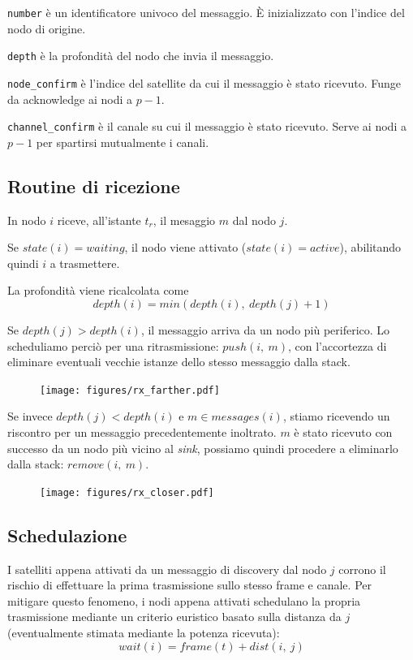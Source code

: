 \documentclass[a4paper,12pt]{article}
\theoremstyle{definition}
\begin{document}
\texttt{number} è un identificatore univoco del messaggio. È inizializzato con l'indice del nodo di origine.

\texttt{depth} è la profondità del nodo che invia il messaggio.

\texttt{node\_confirm} è l'indice del satellite da cui il messaggio è stato ricevuto. Funge da acknowledge ai nodi a $p-1$.

\texttt{channel\_confirm} è il canale su cui il messaggio è stato ricevuto. Serve ai nodi a $p-1$ per spartirsi mutualmente i canali.

\subsection{Routine di ricezione}

In nodo $i$ riceve, all'istante $t_r$, il mesaggio $m$ dal nodo $j$.

Se $state(i) = waiting$, il nodo viene attivato ($state(i) = active$), abilitando quindi $i$ a trasmettere.

La profondità viene ricalcolata come
\begin{equation*}
depth(i) = min(depth(i),\ depth(j)+1)
\end{equation*}

Se $depth(j) > depth(i)$, il messaggio arriva da un nodo più periferico. Lo scheduliamo perciò per una ritrasmissione: $push(i,\ m)$, con l'accortezza di eliminare eventuali vecchie istanze dello stesso messaggio dalla stack.

\begin{figure}[H]
\centering
\texttt{[image: figures/rx\_farther.pdf]}
\caption{}
\end{figure}

Se invece $depth(j) < depth(i)$ e $m \in messages(i)$, stiamo ricevendo un riscontro per un messaggio precedentemente inoltrato. $m$ è stato ricevuto con successo da un nodo più vicino al \emph{sink}, possiamo quindi procedere a eliminarlo dalla stack: $remove(i,\ m)$.

\begin{figure}[H]
\centering
\texttt{[image: figures/rx\_closer.pdf]}
\caption{}
\end{figure}

\subsection{Schedulazione}

I satelliti appena attivati da un messaggio di discovery dal nodo $j$ corrono il rischio di effettuare la prima trasmissione sullo stesso frame e canale. Per mitigare questo fenomeno, i nodi appena attivati schedulano la propria trasmissione mediante un criterio euristico basato sulla distanza da $j$ (eventualmente stimata mediante la potenza ricevuta):
\begin{equation*}
wait(i) = frame(t) + dist(i,\ j)
\end{equation*}
\end{document}
